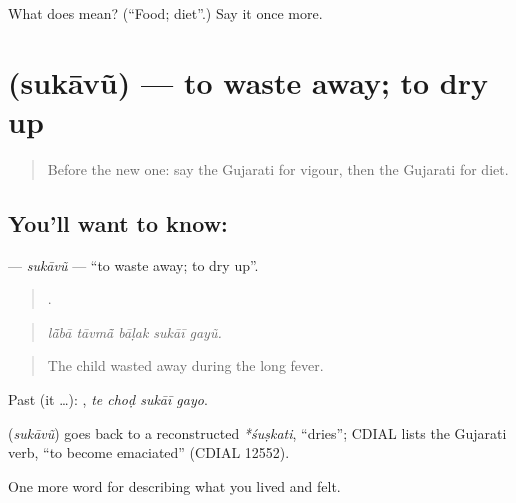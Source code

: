 \begin{tcolorbox}[breakable,colback=teal!4,colframe=teal!35!black,title={Before you move on}]
What does  mean? (\textquotedblleft{}Food; diet\textquotedblright{}.) Say it once more.
\end{tcolorbox}
\section[\texorpdfstring{\gu{સુકાવું} (sukāvũ)}{સુકાવું (sukāvũ)}]{ (sukāvũ) — to waste away; to dry up}

\label{lesson:GU-C486-sukavu}



\begin{quote}
Before the new one: say the Gujarati for vigour, then the Gujarati for diet.
\end{quote}

\subsection*{You'll want to know: }
\textbf{} — \emph{sukāvũ} — \textquotedblleft{}to waste away; to dry up\textquotedblright{}.

\begin{quote}
    .
\end{quote}

\begin{quote}
\emph{lā̃bā tāvmā̃ bāḷak sukāī gayũ.}
\end{quote}

\begin{quote}
The child wasted away during the long fever.
\end{quote}

Past (it …):    , \emph{te choḍ sukāī gayo}.

\begin{cousinweb}
\textbf{} (\emph{sukāvũ}) goes back to a reconstructed \emph{*śuṣkati}, \textquotedblleft{}dries\textquotedblright{}; CDIAL lists the Gujarati verb, \textquotedblleft{}to become emaciated\textquotedblright{} (CDIAL 12552).
\end{cousinweb}

\begin{grammarlens}[title={What you've built}]
One more word for describing what you lived and felt.
\end{grammarlens}

